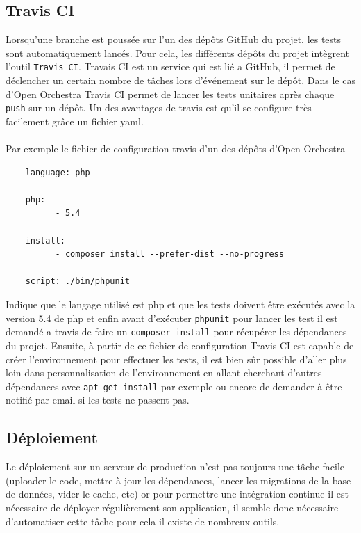 \subsection{Travis CI}
Lorsqu'une branche est poussée sur l'un des dépôts GitHub du projet, les tests sont automatiquement lancés. Pour cela, les différents dépôts du projet intègrent l'outil \verb?Travis CI?. Travais CI est un service qui est lié a GitHub, il permet de déclencher un certain nombre de tâches lors d'événement sur le dépôt. Dans le cas d'Open Orchestra Travis CI permet de lancer les tests unitaires après chaque \verb?push? sur un dépôt. Un des avantages de travis est qu'il se configure très facilement grâce un fichier yaml.
\paragraph{}
Par exemple le fichier de configuration travis d'un des dépôts d'Open Orchestra 
\begin{verbatim}
    language: php

    php:
          - 5.4

    install:
          - composer install --prefer-dist --no-progress
 
    script: ./bin/phpunit
\end{verbatim}

Indique que le langage utilisé est php et que les tests doivent être exécutés avec la version 5.4 de php et enfin avant d'exécuter \verb?phpunit? pour lancer les test il est demandé a travis de faire un \verb?composer install? pour récupérer les dépendances du projet. Ensuite, à partir de ce fichier de configuration Travis CI est capable de créer l'environnement pour effectuer les tests, il est bien sûr possible d'aller plus loin dans  personnalisation de l'environnement en allant cherchant d'autres dépendances avec \verb?apt-get install? par exemple ou encore de demander à être notifié par email si les tests ne passent pas.

\subsection{Déploiement}
Le déploiement sur un serveur de production n'est pas toujours une tâche facile (uploader le code, mettre à jour les dépendances, lancer les migrations de la base de données, vider le cache, etc)  or pour permettre une intégration continue il est nécessaire de déployer régulièrement son application, il semble donc nécessaire d'automatiser cette tâche pour cela il existe de nombreux outils. 
